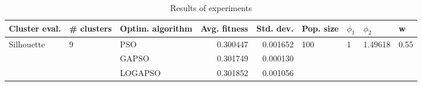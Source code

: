 \begin{table}
\centering
\caption{Results of experiments}
\begin{tabular}{lllrrllll}
\toprule
              Cluster eval. &        \# clusters & Optim. algorithm &  Avg. fitness &  Std. dev. &            Pop. size &         $\phi_{1}$ &               $\phi_{2}$ &                     w \\
\midrule
\multirow{3}{*}{Silhouette} & \multirow{3}{*}{9} &              PSO &      0.300447 &   0.001652 & \multirow{3}{*}{100} & \multirow{3}{*}{1} & \multirow{3}{*}{1.49618} & \multirow{3}{*}{0.55} \\
                            &                    &            GAPSO &      0.301749 &   0.000130 &                      &                    &                          &                       \\
                            &                    &          LOGAPSO &      0.301852 &   0.001056 &                      &                    &                          &                       \\
\bottomrule
\end{tabular}
\end{table}
